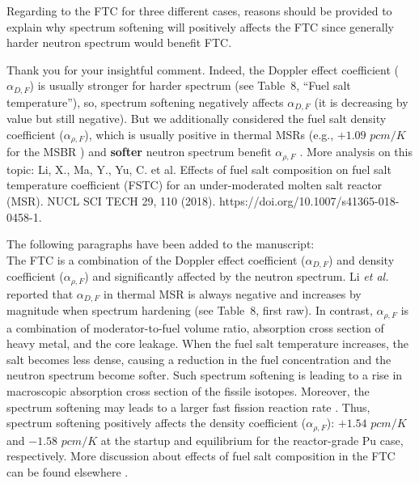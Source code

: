 \documentclass[answers,11pt]{exam}
\begin{document}
\begin{questions}
        \question Regarding to the FTC for three different cases, reasons should be provided to explain why spectrum softening will positively affects the FTC since generally harder neutron spectrum would benefit FTC.
        \begin{solution}
                Thank you for your insightful comment.  Indeed, the Doppler 
                effect coefficient ($\alpha_{D,F}$) is usually stronger for 
                harder spectrum (see Table~8, ``Fuel salt temperature''), so, 
                spectrum softening negatively affects $\alpha_{D,F}$ (it is 
                decreasing by value but still negative). But we additionally 
                considered the fuel salt density coefficient 
                ($\alpha_{\rho,F}$), which is usually positive in thermal MSRs 
                (e.g., $+1.09$ $pcm/K$ for the \gls{MSBR}           
                \cite{robertson_conceptual_1971}) and \textbf{softer} neutron 
                spectrum benefit $\alpha_{\rho,F}$ \cite{li_effects_2018-1, 
                rykhlevskii2019modeling}. More analysis on this topic:
            Li, X., Ma, Y., Yu, C. et al. Effects of fuel salt composition on 
            fuel salt temperature coefficient (FSTC) for an under-moderated 
            molten salt reactor (MSR). NUCL SCI TECH 29, 110 (2018). 
            https://doi.org/10.1007/s41365-018-0458-1.     
	            
	            The following paragraphs have been added to the manuscript:\\

	            The \gls{FTC} is a combination of the Doppler effect 
	            coefficient ($\alpha_{D,F}$) and density coefficient 
	            ($\alpha_{\rho,F}$) and significantly affected by the neutron 
	            spectrum. Li \emph{et al.} reported that 	            
	            $\alpha_{D,F}$ in thermal \gls{MSR} is always negative and 
	            increases by magnitude when spectrum hardening (see Table~8, 
	            first raw). In contrast, $\alpha_{\rho,F}$ is a combination of 
	            moderator-to-fuel volume ratio, absorption cross section of 
	            heavy metal, and the core leakage. When the fuel salt 
	            temperature increases, the salt becomes less dense, 
	            causing a reduction in the fuel concentration and the neutron 
	            spectrum become softer. Such spectrum softening is leading to 
	            a rise in macroscopic absorption cross section of the fissile 
	            isotopes. Moreover, the spectrum softening may leads to 
	            a larger fast fission reaction rate \cite{li_effects_2018-1}. 
	            Thus, spectrum softening positively affects the density 
	            coefficient ($\alpha_{\rho,F}$): $+1.54$ $pcm/K$ and $-1.58$ 
	            $pcm/K$ at the startup and equilibrium for the 
	            reactor-grade Pu case, respectively. More discussion about 
	            effects of fuel salt composition in the \gls{FTC} can be found 
	            elsewhere 
	            \cite{li_effects_2018-1}.
        \end{solution}


\end{questions}
\end{document}
